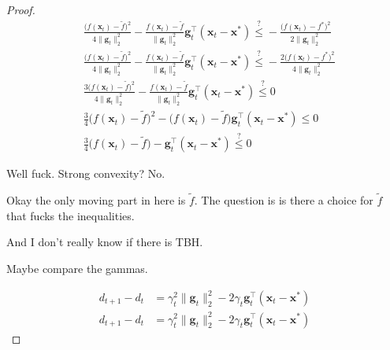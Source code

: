 \documentclass{article}
\begin{document}
\begin{proof}
	\begin{align}
		&\frac{\big(f(\mathbf{x}_t)-\tilde{f} \big)^2}{4\|\mathbf{g}_t\|^2_2}   - \frac{f(\mathbf{x}_t)-\tilde{f} }{ \|\mathbf{g}_t\|^2_2} \mathbf{g}_t^\top(\mathbf{x}_t-\mathbf{x}^*) \stackrel{?}{\le}  -\frac{\big(f(\mathbf{x}_t)-f^*\big)^2}{2\|\mathbf{g}_t\|^2_2}\\
		&\frac{\big(f(\mathbf{x}_t)-\tilde{f} \big)^2}{4\|\mathbf{g}_t\|^2_2}   - \frac{f(\mathbf{x}_t)-\tilde{f} }{ \|\mathbf{g}_t\|^2_2} \mathbf{g}_t^\top(\mathbf{x}_t-\mathbf{x}^*) \stackrel{?}{\le} -\frac{2\big(f(\mathbf{x}_t)-f^*\big)^2}{4\|\mathbf{g}_t\|^2_2}\\
		&\frac{3\big(f(\mathbf{x}_t)-\tilde{f} \big)^2}{4\|\mathbf{g}_t\|^2_2}   - \frac{f(\mathbf{x}_t)-\tilde{f} }{ \|\mathbf{g}_t\|^2_2} \mathbf{g}_t^\top(\mathbf{x}_t-\mathbf{x}^*) \stackrel{?}{\le}  0\\
		&\frac{3}{4}\big(f(\mathbf{x}_t)-\tilde{f} \big)^2  - \big(f(\mathbf{x}_t)-\tilde{f}\big)  \mathbf{g}_t^\top(\mathbf{x}_t-\mathbf{x}^*) \le  0\\
		&\frac{3}{4}\big(f(\mathbf{x}_t)-\tilde{f} \big)  -  \mathbf{g}_t^\top(\mathbf{x}_t-\mathbf{x}^*) \stackrel{?}{\le}  0
	\end{align}
	
	Well fuck. Strong convexity? No. 
	
	Okay the only moving part in here is $\tilde{f}$. The question is is there a choice for $\tilde{f}$ that fucks the inequalities. 
	
	And I don't really know if there is TBH. 
	
	Maybe compare the gammas. 
	
	\begin{align}
		d_{t+1} - d_t &= \gamma_t^2 \|\mathbf{g}_t\|^2_2 - 2\gamma_t \mathbf{g}_t^\top(\mathbf{x}_t-\mathbf{x}^*)\\
		d_{t+1} - d_t &= \gamma_t^2 \|\mathbf{g}_t\|^2_2 - 2\gamma_t \mathbf{g}_t^\top(\mathbf{x}_t-\mathbf{x}^*)
	\end{align}


\end{proof}
\end{document}
